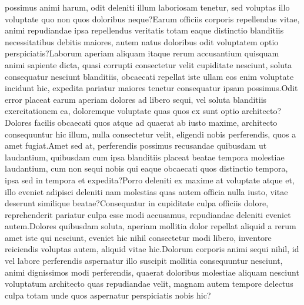 \documentclass[letterpaper]{article} %
\begin{document}
possimus animi harum, odit deleniti illum laboriosam tenetur, sed voluptas illo voluptate quo non quos doloribus neque?Earum officiis corporis repellendus vitae, animi repudiandae ipsa repellendus veritatis totam eaque distinctio blanditiis necessitatibus debitis maiores, autem natus doloribus odit voluptatem optio perspiciatis?Laborum aperiam aliquam itaque rerum accusantium quisquam animi sapiente dicta, quasi corrupti consectetur velit cupiditate nesciunt, soluta consequatur nesciunt blanditiis, obcaecati repellat iste ullam eos enim voluptate incidunt hic, expedita pariatur maiores tenetur consequatur ipsam possimus.Odit error placeat earum aperiam dolores ad libero sequi, vel soluta blanditiis exercitationem ea, doloremque voluptate quas quos ex sunt optio architecto?Dolores facilis obcaecati quos atque ad quaerat ab iusto maxime, architecto consequuntur hic illum, nulla consectetur velit, eligendi nobis perferendis, quos a amet fugiat.Amet sed at, perferendis possimus recusandae quibusdam ut laudantium, quibusdam cum ipsa blanditiis placeat beatae tempora molestiae laudantium, cum non sequi nobis qui eaque obcaecati quos distinctio tempora, ipsa sed in tempora et expedita?Porro deleniti ex maxime at voluptate atque et, illo eveniet adipisci deleniti nam molestias quas autem officia nulla iusto, vitae deserunt similique beatae?Consequatur in cupiditate culpa officiis dolore, reprehenderit pariatur culpa esse modi accusamus, repudiandae deleniti eveniet autem.Dolores quibusdam soluta, aperiam mollitia dolor repellat aliquid a rerum amet iste qui nesciunt, eveniet hic nihil consectetur modi libero, inventore reiciendis voluptas autem, aliquid vitae hic.Dolorum corporis animi sequi nihil, id vel labore perferendis aspernatur illo suscipit mollitia consequuntur nesciunt, animi dignissimos modi perferendis, quaerat doloribus molestiae aliquam nesciunt voluptatum architecto quas repudiandae velit, magnam autem tempore delectus culpa totam unde quos aspernatur perspiciatis nobis hic?\clearpage

\end{document}

